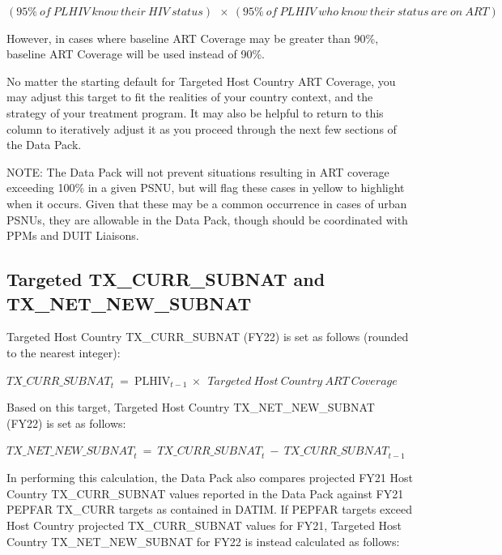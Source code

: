 \documentclass[
  openany]{book}
\begin{document}
\begin{center} $(95\%\ of\ PLHIV\ know\ their\ HIV\ status)\ \  \times \ (95\%\ of\ PLHIV\ who\ know\ their\ status\ are\ on\ ART)$ \end{center}

However, in cases where baseline ART Coverage may be greater than 90\%,
baseline ART Coverage will be used instead of 90\%.

No matter the starting default for Targeted Host Country ART Coverage,
you may adjust this target to fit the realities of your country context,
and the strategy of your treatment program. It may also be helpful to
return to this column to iteratively adjust it as you proceed through
the next few sections of the Data Pack.

NOTE: The Data Pack will not prevent situations resulting in ART
coverage exceeding 100\% in a given PSNU, but will flag these cases in
yellow to highlight when it occurs. Given that these may be a common
occurrence in cases of urban PSNUs, they are allowable in the Data Pack,
though should be coordinated with PPMs and DUIT Liaisons.

\hypertarget{targeted-tx_curr_subnat-and-tx_net_new_subnat}{%
\subsection{Targeted TX\_CURR\_SUBNAT and TX\_NET\_NEW\_SUBNAT}\label{targeted-tx_curr_subnat-and-tx_net_new_subnat}}

Targeted Host Country TX\_CURR\_SUBNAT (FY22) is set as follows (rounded
to the nearest integer):

\begin{center} ${TX\_ CURR\_ SUBNAT}_{t}\  = \ \text{PLHIV}_{t - 1}\  \times \ \ Targeted\ Host\ Country\ ART\ Coverage$ \end{center}

Based on this target, Targeted Host Country TX\_NET\_NEW\_SUBNAT (FY22) is
set as follows:

\begin{center} ${TX\_ NET\_ NEW\_ SUBNAT}_{t}\  = \ {TX\_ CURR\_ SUBNAT}_{t}\  - \ {TX\_ CURR\_ SUBNAT}_{t - 1}$ \end{center}

In performing this calculation, the Data Pack also compares projected
FY21 Host Country TX\_CURR\_SUBNAT values reported in the Data Pack
against FY21 PEPFAR TX\_CURR targets as contained in DATIM. If PEPFAR
targets exceed Host Country projected TX\_CURR\_SUBNAT values for FY21,
Targeted Host Country TX\_NET\_NEW\_SUBNAT for FY22 is instead calculated
as follows:
\end{document}
